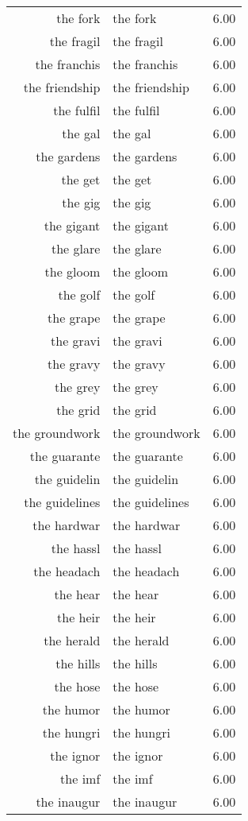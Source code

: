 \begin{table}[ht]
\begin{tabular}{rlr}
  the fork & the fork & 6.00 \\ 
  the fragil & the fragil & 6.00 \\ 
  the franchis & the franchis & 6.00 \\ 
  the friendship & the friendship & 6.00 \\ 
  the fulfil & the fulfil & 6.00 \\ 
  the gal & the gal & 6.00 \\ 
  the gardens & the gardens & 6.00 \\ 
  the get & the get & 6.00 \\ 
  the gig & the gig & 6.00 \\ 
  the gigant & the gigant & 6.00 \\ 
  the glare & the glare & 6.00 \\ 
  the gloom & the gloom & 6.00 \\ 
  the golf & the golf & 6.00 \\ 
  the grape & the grape & 6.00 \\ 
  the gravi & the gravi & 6.00 \\ 
  the gravy & the gravy & 6.00 \\ 
  the grey & the grey & 6.00 \\ 
  the grid & the grid & 6.00 \\ 
  the groundwork & the groundwork & 6.00 \\ 
  the guarante & the guarante & 6.00 \\ 
  the guidelin & the guidelin & 6.00 \\ 
  the guidelines & the guidelines & 6.00 \\ 
  the hardwar & the hardwar & 6.00 \\ 
  the hassl & the hassl & 6.00 \\ 
  the headach & the headach & 6.00 \\ 
  the hear & the hear & 6.00 \\ 
  the heir & the heir & 6.00 \\ 
  the herald & the herald & 6.00 \\ 
  the hills & the hills & 6.00 \\ 
  the hose & the hose & 6.00 \\ 
  the humor & the humor & 6.00 \\ 
  the hungri & the hungri & 6.00 \\ 
  the ignor & the ignor & 6.00 \\ 
  the imf & the imf & 6.00 \\ 
  the inaugur & the inaugur & 6.00 \\ 

\end{tabular}
\end{table}

